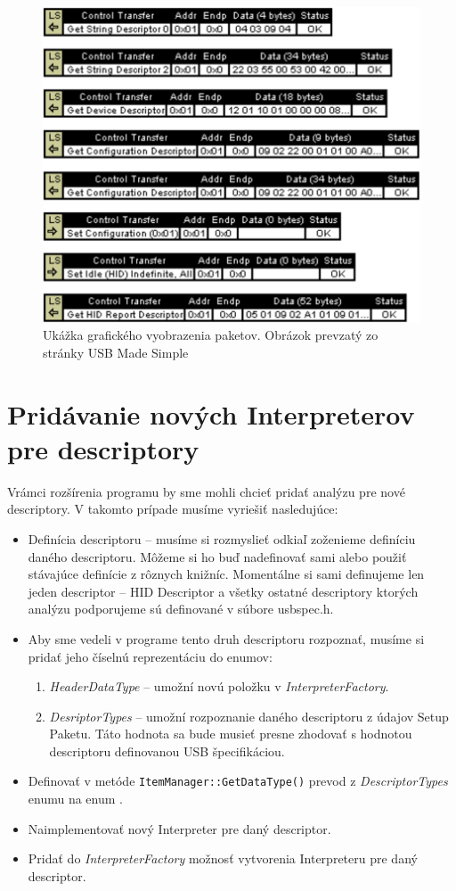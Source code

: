 \begin{figure}[!htb]
	\centering
	\includegraphics[width=12cm]{img/kap05_graphics_packets}
	\caption{Ukážka grafického vyobrazenia paketov. Obrázok prevzatý zo stránky USB Made Simple~\cite{usbmadesimple_graphics}}
	\label{obr:kap5:graphics_packets}
\end{figure}

\newpage
\section{Pridávanie nových Interpreterov pre descriptory}
Vrámci rozšírenia programu by sme mohli chcieť pridať analýzu pre nové descriptory. V takomto prípade musíme vyriešiť nasledujúce:
\begin{itemize}
\item Definícia descriptoru -- musíme si rozmyslieť odkiaľ zoženieme definíciu daného descriptoru. Môžeme si ho buď nadefinovať sami alebo použiť stávajúce definície z rôznych knižníc. Momentálne si sami definujeme len jeden descriptor -- HID Descriptor a všetky ostatné descriptory ktorých analýzu podporujeme sú definované v súbore usbspec.h.
\item Aby sme vedeli v programe tento druh descriptoru rozpoznať, musíme si pridať jeho číselnú reprezentáciu do enumov:
\begin{enumerate}
\item \textit{HeaderDataType} -- umožní novú položku v \textit{InterpreterFactory}.
\item \textit{DesriptorTypes} -- umožní rozpoznanie daného descriptoru z údajov Setup Paketu. Táto hodnota sa bude musieť presne zhodovať s hodnotou descriptoru definovanou USB špecifikáciou.
\end{enumerate}
\item Definovať v metóde \texttt{ItemManager::GetDataType()} prevod z \textit{DescriptorTypes} enumu na enum .
\item Naimplementovať nový Interpreter pre daný descriptor.
\item Pridať do \textit{InterpreterFactory} možnosť vytvorenia Interpreteru pre daný descriptor.
\end{itemize}
